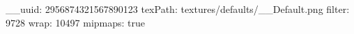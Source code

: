 __uuid: 2956874321567890123
texPath: textures/defaults/__Default.png
filter: 9728
wrap: 10497
mipmaps: true